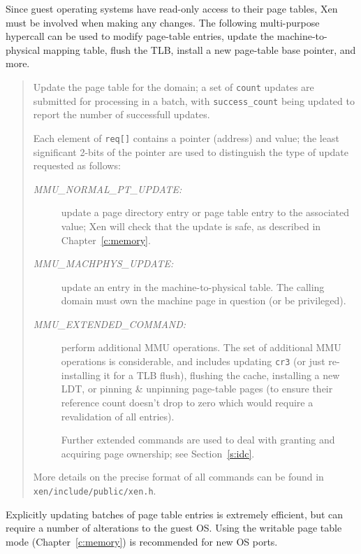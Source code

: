 \documentclass[11pt,twoside,final,openright]{xenstyle}
\begin{document}
Since guest operating systems have read-only access to their page 
tables, Xen must be involved when making any changes. The following
multi-purpose hypercall can be used to modify page-table entries, 
update the machine-to-physical mapping table, flush the TLB, install 
a new page-table base pointer, and more.

\begin{quote} 

Update the page table for the domain; a set of {\tt count} updates are
submitted for processing in a batch, with {\tt success\_count} being 
updated to report the number of successfull updates.  

Each element of {\tt req[]} contains a pointer (address) and value; 
the least significant 2-bits of the pointer are used to distinguish 
the type of update requested as follows:
\begin{description} 

\item[\it MMU\_NORMAL\_PT\_UPDATE:] update a page directory entry or
page table entry to the associated value; Xen will check that the
update is safe, as described in Chapter~\ref{c:memory}.

\item[\it MMU\_MACHPHYS\_UPDATE:] update an entry in the
  machine-to-physical table. The calling domain must own the machine
  page in question (or be privileged).

\item[\it MMU\_EXTENDED\_COMMAND:] perform additional MMU operations.
The set of additional MMU operations is considerable, and includes
updating {\tt cr3} (or just re-installing it for a TLB flush),
flushing the cache, installing a new LDT, or pinning \& unpinning
page-table pages (to ensure their reference count doesn't drop to zero
which would require a revalidation of all entries).

Further extended commands are used to deal with granting and 
acquiring page ownership; see Section~\ref{s:idc}. 


\end{description}

More details on the precise format of all commands can be 
found in {\tt xen/include/public/xen.h}. 


\end{quote}

Explicitly updating batches of page table entries is extremely
efficient, but can require a number of alterations to the guest
OS. Using the writable page table mode (Chapter~\ref{c:memory}) is
recommended for new OS ports.
\end{document}
